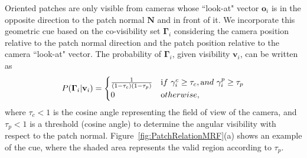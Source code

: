 Oriented patches are only visible from cameras whose ``look-at" vector $\mathbf{o}_i$ is in the opposite direction to the patch normal $\mathbf{N}$ and in front of it. We incorporate this geometric cue based on the co-visibility set $\bm{\Gamma}_i$ considering the camera position relative to the patch normal direction and the patch position relative to the camera ``look-at" vector. The probability of $\bm{\Gamma}_i$, given visibility $\mathbf{v}_i$, can be written as 
\begin{eqnarray}
P(\bm{\Gamma}_i | \mathbf{v}_i ) = \begin{cases} \frac{1}{ (1- \tau_c)(1- \tau_p)} & {\textrm if~} \gamma_i^c \geq \tau_c,{\textrm and~} \gamma_i^p \geq  \tau_p  \\
0 & {\textrm otherwise,}\end{cases} 
\label{eq:eq_normal}
\end{eqnarray}
where $\tau_c<1 $ is the cosine angle representing the field of view of the camera, and $\tau_p<1$ is a threshold (cosine angle) to determine the angular visibility with respect to the patch normal. Figure~\ref{fig:PatchRelationMRF}(a) shows an example of the cue, where the shaded area represents the valid region according to $\tau_p$.


